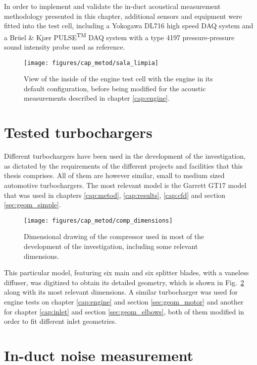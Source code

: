 In order to implement and validate the in-duct acoustical measurement methodology presented in this chapter, additional sensors and equipment were fitted into the test cell, including a Yokogawa DL716 high speed DAQ system and a Brüel \& Kjær PULSE\textsuperscript{TM} DAQ system with a type 4197 pressure-pressure sound intensity probe used as reference.

\begin{figure}[b!]
\centering
\texttt{[image: figures/cap\_metod/sala\_limpia]}
\caption[View of the inside of the engine test cell]{View of the inside of the engine test cell with the engine in its default configuration, before being modified for the acoustic measurements described in chapter \ref{cap:engine}.}
\label{fig:engine_cell_clear}
\end{figure}

\section{Tested turbochargers}

Different turbochargers have been used in the development of the investigation, as dictated by the requirements of the different projects and facilities that this thesis comprises. All of them are however similar, small to medium sized automotive turbochargers. The most relevant model is the Garrett GT17 model that was used in chapters \ref{cap:metod}, \ref{cap:results}, \ref{cap:cfd} and section \ref{sec:geom_simple}. 

\begin{figure}[h!]
\centering
\texttt{[image: figures/cap\_metod/comp\_dimensions]}
\caption[Dimensional drawing of the compressor]{Dimensional drawing of the compressor used in most of the development of the investigation, including some relevant dimensions.}
\label{fig:comp_dimens}
\end{figure}

This particular model, featuring six main and six splitter blades, with a vaneless diffuser, was digitized to obtain its detailed geometry, which is shown in Fig.~\ref{fig:comp_dimens} along with its most relevant dimensions. A similar turbocharger was used for engine tests on chapter \ref{cap:engine} and section \ref{sec:geom_motor} and another for chapter \ref{cap:inlet} and section \ref{sec:geom_elbows}, both of them modified in order to fit different inlet geometries.

\section{In-duct noise measurement} %
\label{sec:method_induct}

